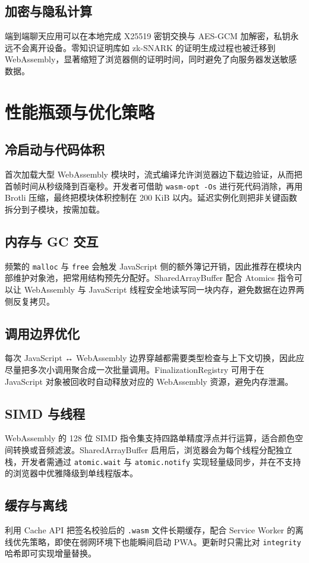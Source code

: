 \section{加密与隐私计算}
端到端聊天应用可以在本地完成 X25519 密钥交换与 AES-GCM 加解密，私钥永远不会离开设备。零知识证明库如 zk-SNARK 的证明生成过程也被迁移到 WebAssembly，显著缩短了浏览器侧的证明时间，同时避免了向服务器发送敏感数据。\par
\chapter{性能瓶颈与优化策略}
\section{冷启动与代码体积}
首次加载大型 WebAssembly 模块时，流式编译允许浏览器边下载边验证，从而把首帧时间从秒级降到百毫秒。开发者可借助 \texttt{wasm-opt -Os} 进行死代码消除，再用 Brotli 压缩，最终把模块体积控制在 200 KiB 以内。延迟实例化则把非关键函数拆分到子模块，按需加载。\par
\section{内存与 GC 交互}
频繁的 \texttt{malloc} 与 \texttt{free} 会触发 JavaScript 侧的额外簿记开销，因此推荐在模块内部维护对象池，把常用结构预先分配好。SharedArrayBuffer 配合 Atomics 指令可以让 WebAssembly 与 JavaScript 线程安全地读写同一块内存，避免数据在边界两侧反复拷贝。\par
\section{调用边界优化}
每次 JavaScript ↔ WebAssembly 边界穿越都需要类型检查与上下文切换，因此应尽量把多次小调用聚合成一次批量调用。FinalizationRegistry 可用于在 JavaScript 对象被回收时自动释放对应的 WebAssembly 资源，避免内存泄漏。\par
\section{SIMD 与线程}
WebAssembly 的 128 位 SIMD 指令集支持四路单精度浮点并行运算，适合颜色空间转换或音频滤波。SharedArrayBuffer 启用后，浏览器会为每个线程分配独立栈，开发者需通过 \texttt{atomic.wait} 与 \texttt{atomic.notify} 实现轻量级同步，并在不支持的浏览器中优雅降级到单线程版本。\par
\section{缓存与离线}
利用 Cache API 把签名校验后的 \texttt{.wasm} 文件长期缓存，配合 Service Worker 的离线优先策略，即使在弱网环境下也能瞬间启动 PWA。更新时只需比对 \texttt{integrity} 哈希即可实现增量替换。\par
